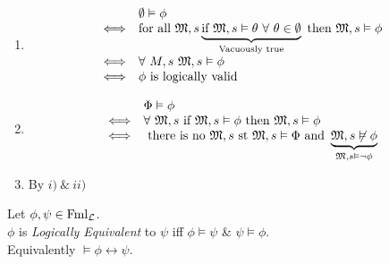 \documentclass[11pt,a4paper]{article}
\begin{document}
\begin{enumerate}
	\item \[\begin{array}{rl}
	&\emptyset\vDash\phi\\
	\Longleftrightarrow&\text{for all }\mathfrak{M},s\underbrace{\text{if }\mathfrak{M},s\vDash\theta\ \forall\ \theta\in\emptyset}_{\text{Vacuously true}}\text{ then }\mathfrak{M},s\vDash\phi\\
	\Longleftrightarrow&\forall\ M,s\ \mathfrak{M},s\vDash\phi\\
	\Longleftrightarrow&\phi\text{ is logically valid}\\
	\end{array}\]
	\item \[\begin{array}{rl}
	&\Phi\vDash\phi\\
	\Longleftrightarrow&\forall\ \mathfrak{M},s\text{ if }\mathfrak{M},s\vDash\phi\text{ then }\mathfrak{M},s\vDash\phi\\
	\Longleftrightarrow&\text{ there is no }\mathfrak{M},s\text{ st }\mathfrak{M},s\vDash\Phi\text{ and }\underbrace{\mathfrak{M},s\not\vDash\phi}_{\mathfrak{M},s\vDash\neg\phi}
	\end{array}\]
	\item By $i)\ \&\ ii)$
\end{enumerate}

Let $\phi,\psi\in\text{Fml}_{\mathcal{L}}$.\\
$\phi$ is \textit{Logically Equivalent} to $\psi$ iff $\phi\vDash\psi$ \& $\psi\vDash\phi$.\\
\nb Equivalently $\vDash\phi\leftrightarrow\psi$.
\end{document}
